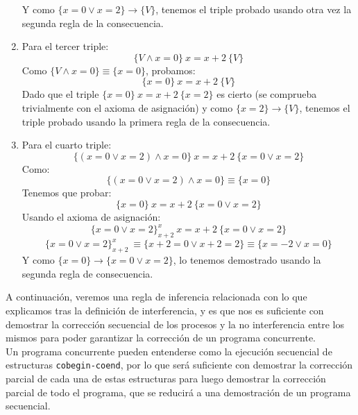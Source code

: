 \begin{ejemplo}
\begin{enumerate}
\begin{equation*}
            \end{equation*}
            Y como $\{x=0 \lor x=2\} \rightarrow \{V\}$, tenemos el triple probado usando otra vez la segunda regla de la consecuencia.
        \item Para el tercer triple:
            \begin{equation*}
                \{V \land x=0\}\ x=x+2\ \{V\}
            \end{equation*}
            Como $\{V \land x=0\}\equiv \{x=0\}$, probamos:
            \begin{equation*}
                \{x=0\}\ x=x+2\ \{V\}
            \end{equation*}
            Dado que el triple $\{x=0\}\ x=x+2\ \{x=2\}$ es cierto (se comprueba trivialmente con el axioma de asignación) y como $\{x=2\}\rightarrow\{V\}$, tenemos el triple probado usando la primera regla de la consecuencia.
        \item Para el cuarto triple:
            \begin{equation*}
                \{(x=0 \lor x=2)\land x=0\}\ x=x+2\ \{x=0 \lor x=2\}
            \end{equation*}
            Como:
            \begin{equation*}
                \{(x=0 \lor x=2) \land x=0\} \equiv \{x=0\}
            \end{equation*}
            Tenemos que probar:
            \begin{equation*}
                \{x=0\}\ x=x+2\ \{x=0 \lor x=2\}
            \end{equation*}
            Usando el axioma de asignación:
            \begin{equation*}
                \{x=0 \lor x=2\}^x_{x+2}\ x=x+2\ \{x=0 \lor x=2\}
            \end{equation*}
            \begin{equation*}
                \{x=0 \lor x=2\}^x_{x+2}\ \equiv \{x+2=0 \lor x+2=2\} \equiv \{x=-2 \lor x=0\}
            \end{equation*}
            Y como $\{x=0\}\rightarrow\{x=0 \lor x=2\}$, lo tenemos demostrado usando la segunda regla de consecuencia.
    \end{enumerate}
    
\end{ejemplo}

A continuación, veremos una regla de inferencia relacionada con lo que explicamos tras la definición de interferencia, y es que nos es suficiente con demostrar la corrección secuencial de los procesos y la no interferencia entre los mismos para poder garantizar la corrección de un programa concurrente.\\
Un programa concurrente pueden entenderse como la ejecución secuencial de estructuras \texttt{cobegin-coend}, por lo que será suficiente con demostrar la corrección parcial de cada una de estas estructuras para luego demostrar la corrección parcial de todo el programa, que se reducirá a una demostración de un programa secuencial.

